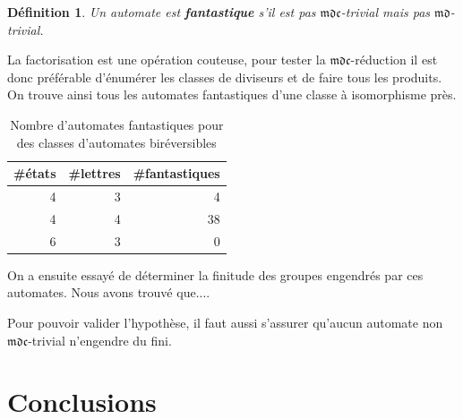 \documentclass[11pt,a4paper]{article}
\newtheorem{definition}{Définition}
\begin{document}
\begin{definition}
  Un automate est \textbf{\textit{fantastique}} s'il est pas $\mathfrak{mdc}$-trivial mais pas $\mathfrak{md}$-trivial.
\end{definition}

La factorisation est une opération couteuse, pour tester la $\mathfrak{mdc}$-réduction il est donc préférable d'énumérer les classes de diviseurs et de faire tous les produits. On trouve ainsi tous les automates fantastiques d'une classe à isomorphisme près.

\begin{table}[h!]
  \begin{center}
    \begin{threeparttable}
      \begin{tabular}{|rrr|}
        \hline
        \#états & \#lettres & \#fantastiques \\ [0.5ex]
        \hline\hline
        \hline
        4 & 3 & 4 \\
        \hline
        4 & 4 & 38 \\
        \hline
        6 & 3 & 0 \\
        \hline
      \end{tabular}
      \caption{Nombre d'automates fantastiques pour des classes d'automates biréversibles}
    \end{threeparttable}
  \end{center}
\end{table}

On a ensuite essayé de déterminer la finitude des groupes engendrés par ces automates. Nous avons trouvé que....

Pour pouvoir valider l'hypothèse, il faut aussi s'assurer qu'aucun automate non $\mathfrak{mdc}$-trivial n'engendre du fini.


\section{Conclusions}

\newpage
{
  \nocite{*}
}

\end{document}
